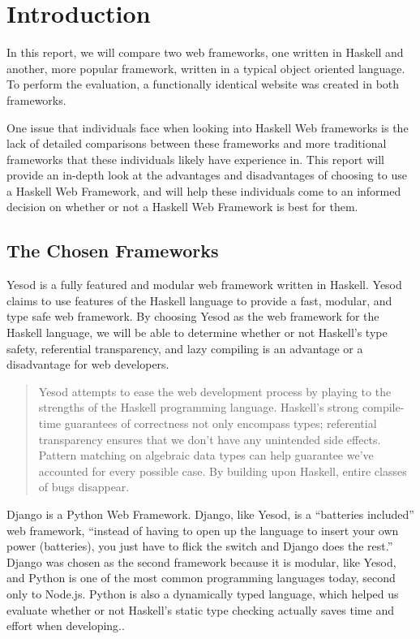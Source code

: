 \chapter{Introduction}
\label{chap:Introduction}

In this report, we will compare two web frameworks, one written in Haskell and another, more
popular framework, written in a typical object oriented language. To perform the evaluation,
a functionally identical website was created in both frameworks.

One issue that individuals face when looking into Haskell Web frameworks is the lack of
detailed comparisons between these frameworks and more traditional frameworks that these
individuals likely have experience in. This report will provide an in-depth look at the
advantages and disadvantages of choosing to use a Haskell Web Framework, and will help
these individuals come to an informed decision on whether or not a Haskell Web Framework is
best for them.

\section{The Chosen Frameworks}

Yesod is a fully featured and modular web framework written in Haskell. Yesod claims to use
features of the Haskell language to provide a fast, modular, and type safe web framework. By
choosing Yesod as the web framework for the Haskell language, we will be able to determine
whether or not Haskell's type safety, referential transparency, and lazy compiling is an advantage
or a disadvantage for web developers.

\begin{quote}
Yesod attempts to ease the web development process by playing to the strengths of the Haskell 
programming language. Haskell’s strong compile-time guarantees of correctness not only encompass 
types; referential transparency ensures that we don’t have any unintended side effects. Pattern 
matching on algebraic data types can help guarantee we’ve accounted for every possible case. 
By building upon Haskell, entire classes of bugs disappear. \parencite[Introduction]{yesodBook}
\end{quote}

Django is a Python Web Framework. Django, like Yesod, is a ``batteries included'' web framework,
``instead of having to open up the language to insert your own power (batteries), you just have
to flick the switch and Django does the rest.'' Django was chosen as the second framework
because it is modular, like Yesod, and Python is one of the most common programming
languages today, second only to Node.js. Python is also a dynamically typed
language, which helped us evaluate whether or not Haskell's static type checking
actually saves time and effort when developing.\parencite{djangoBookReasons}.

